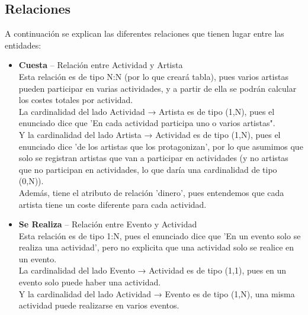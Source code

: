 \documentclass[12pt]{article}
\begin{document}
    \newpage
    \subsection{Relaciones}
    A continuación se explican las diferentes relaciones que tienen lugar entre las entidades:

    \begin{itemize}

        \item \textbf{Cuesta} -- Relación entre Actividad y Artista\\
            Esta relación es de tipo N:N (por lo que creará tabla), pues varios artistas pueden participar en varias actividades, y a partir de ella se 
            podrán calcular los costes totales por actividad. \\
            La cardinalidad del lado Actividad → Artista es de tipo (1,N), pues el enunciado dice que 'En cada actividad participa uno o varios artistas". \\
            Y la cardinalidad del lado Artista → Actividad es de tipo (1,N), pues el enunciado dice 'de los artistas que los protagonizan', por lo que asumimos
            que solo se registran artistas que van a participar en actividades (y no artistas que no participan en actividades, lo que daría una cardinalidad
            de tipo (0,N)). \\
            Además, tiene el atributo de relación 'dinero', pues entendemos que cada artista tiene un coste diferente para cada actividad.
        
        \item \textbf{Se Realiza} -- Relación entre Evento y Actividad\\
            Esta relación es de tipo 1:N, pues el enunciado dice que 'En un evento solo se realiza una actividad', pero no explicita que una actividad solo se 
            realice en un evento. \\
            La cardinalidad del lado Evento → Actividad es de tipo (1,1), pues en un evento solo puede haber una actividad. \\
            Y la cardinalidad del lado Actividad → Evento es de tipo (1,N), una misma actividad puede realizarse en varios eventos.


\end{itemize}
\end{document}
